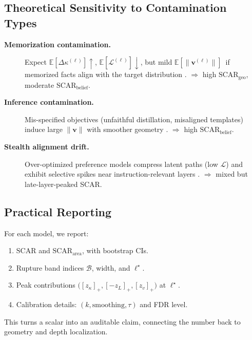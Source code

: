 \documentclass[11pt]{article}
\begin{document}
\vspace{0.6em}
\subsection{Theoretical Sensitivity to Contamination Types}
\label{subsec:scar-sensitivity}
\begin{description}
\item[\textbf{Memorization contamination.}] Expect $\mathbb{E}[\Delta\kappa^{(\ell)}]\!\uparrow$, $\mathbb{E}[\mathcal{L}^{(\ell)}]\!\downarrow$, but mild $\mathbb{E}[\|\mathbf{v}^{(\ell)}\|]\,$ if memorized facts align with the target distribution \citep{geirhos2020shortcut}. $\Rightarrow$ high $\mathrm{SCAR}_{\mathrm{geo}}$, moderate $\mathrm{SCAR}_{\mathrm{belief}}$.
\item[\textbf{Inference contamination.}] Mis-specified objectives (unfaithful distillation, misaligned templates) induce large $\|\mathbf{v}\|$ with smoother geometry \citep{ouyang2022instructgpt,bai2022harmless}. $\Rightarrow$ high $\mathrm{SCAR}_{\mathrm{belief}}$.
\item[\textbf{Stealth alignment drift.}] Over-optimized preference models compress latent paths (low $\mathcal{L}$) and exhibit selective spikes near instruction-relevant layers \citep{rafailov2023dpo}. $\Rightarrow$ mixed but late-layer-peaked SCAR.
\end{description}

\vspace{0.6em}
\subsection{Practical Reporting}
\label{subsec:scar-reporting}
For each model, we report:
\begin{enumerate}\setlength\itemsep{2pt}
\item $\mathrm{SCAR}$ and $\mathrm{SCAR}_{\mathrm{area}}$, with bootstrap CIs.
\item Rupture band indices $\mathcal{B}$, width, and $\ell^\star$.
\item Peak contributions $\big([z_\kappa]_{+},[-z_L]_{+},[z_v]_{+}\big)$ at $\ell^\star$.
\item Calibration details: $(k,\text{smoothing},\tau)$ and FDR level.
\end{enumerate}
This turns a scalar into an auditable claim, connecting the number back to geometry and depth localization.

\end{document}
